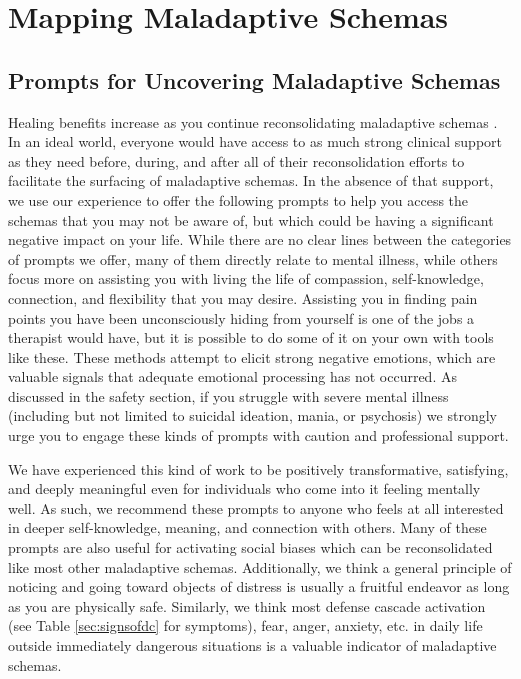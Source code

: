 \documentclass[12pt,letterpaper]{book}
\begin{document}
\chapter{Mapping Maladaptive Schemas}
\label{mapping}
\section{Prompts for Uncovering Maladaptive Schemas}
\label{uncovering}
Healing benefits increase as you continue reconsolidating maladaptive schemas \cite{eckerUnlocking}. In an ideal world, everyone would have access to as much strong clinical support as they need before, during, and after all of their reconsolidation efforts to facilitate the surfacing of maladaptive schemas. In the absence of that support, we use our experience to offer the following prompts to help you access the schemas that you may not be aware of, but which could be having a significant negative impact on your life. While there are no clear lines between the categories of prompts we offer, many of them directly relate to mental illness, while others focus more on assisting you with living the life of compassion, self-knowledge, connection, and flexibility that you may desire. Assisting you in finding pain points you have been unconsciously hiding from yourself is one of the jobs a therapist would have, but it is possible to do some of it on your own with tools like these. These methods attempt to elicit strong negative emotions, which are valuable signals that adequate emotional processing has not occurred. As discussed in the safety section, if you struggle with severe mental illness (including but not limited to suicidal ideation, mania, or psychosis) we strongly urge you to engage these kinds of prompts with caution and professional support.

We have experienced this kind of work to be positively transformative, satisfying, and deeply meaningful even for individuals who come into it feeling mentally well. As such, we recommend these prompts to anyone who feels at all interested in deeper self-knowledge, meaning, and connection with others. Many of these prompts are also useful for activating social biases which can be reconsolidated like most other maladaptive schemas. Additionally, we think a general principle of noticing and going toward objects of distress is usually a fruitful endeavor as long as you are physically safe. Similarly, we think most defense cascade activation (see Table \ref{sec:signsofdc} for symptoms), fear, anger, anxiety, etc. in daily life outside immediately dangerous situations is a valuable indicator of maladaptive schemas.
\end{document}
